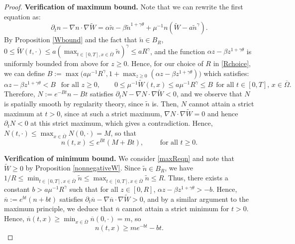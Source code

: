 \documentclass[12pt]{article}
\theoremstyle{plain}
\begin{document}
\begin{proof}
\noindent \textbf{Verification of maximum bound.} Note that we can rewrite the first equation as:
\begin{equation}\label{maxReqn}
\partial_{t}n - \nabla n \cdot \nabla \tilde{W} = \alpha \tilde{n} - \beta \tilde{n}^{1 + \gamma \theta} + \mu^{-1}n(\tilde{W} - a\tilde{n}^{\gamma}).
\end{equation}
By Proposition \ref{Wbound} and the fact that $\tilde{n} \in B_{R}$, $0 \le \tilde{W}(t, \cdot) \le a\left(\max_{t \in [0, T], x \in \overline{\Omega}} \tilde{n}\right)^{\gamma} \le aR^{\gamma}$, and the function $\alpha z - \beta z^{1 + \gamma \theta}$ is uniformly bounded from above for $z \ge 0$. Hence, for our choice of $R$ in \eqref{Rchoice}, we can define $B := \max\Big(a\mu^{-1}R^{\gamma}, 1 + \max_{z \ge 0} (\alpha z - \beta z^{1 + \gamma \theta})\Big)$ which satisfies:
\begin{equation*}
\alpha z - \beta z^{1 + \gamma \theta} < B \ \ \text{ for all } z \ge 0, \qquad 
0 \le \mu^{-1}\tilde{W}(t, x) \le a\mu^{-1}R^{\gamma} \le B \ \ \text{for all $t \in [0, T]$, $x \in \overline{\Omega}$}.
\end{equation*}
Therefore, $N := e^{-Bt}n - Bt$ satisfies $\partial_{t}N - \nabla N \cdot \nabla \tilde{W} < 0$, and we observe that $N$ is spatially smooth by regularity theory, since $\tilde{n}$ is. Then, $N$ cannot attain a strict maximum at $t > 0$, since at such a strict maximum, $\nabla N \cdot \nabla \tilde{W} = 0$ and hence $\partial_{t} N < 0$ at this strict maximum, which gives a contradiction. Hence, $N(t, \cdot) \le \max_{x \in \overline{\Omega}} N(0, \cdot) = M$, so that 
\begin{equation}\label{nBmax}
n(t, x) \le e^{Bt}(M + Bt), \qquad \text{ for all $t \ge 0$.}
\end{equation}

\medskip

\noindent \textbf{Verification of minimum bound.} We consider \eqref{maxReqn} and note that $\tilde{W} \ge 0$ by Proposition \ref{nonnegativeW}. Since $\tilde{n} \in B_{R}$, we have $1/R \le \min_{t \in [0, T], x \in \overline{\Omega}} \tilde{n} \le \max_{t \in [0, T], x \in \overline{\Omega}} \tilde{n} \le R$.
Thus, there exists a constant $b > a\mu^{-1}R^{\gamma}$ such that for all $z \in [0, R]$, $\alpha z - \beta z^{1 + \gamma \theta} > -b$. Hence, $\overline{n} := e^{bt}(n + bt)$ satisfies $\partial_{t}\overline{n} - \nabla \overline{n} \cdot \nabla \tilde{W} > 0$, and by a similar argument to the maximum principle, we deduce that $\overline{n}$ cannot attain a strict minimum for $t > 0$. Hence, $\overline{n}(t, x) \ge \min_{x \in \overline{\Omega}} \overline{n}(0, \cdot) = m$, so
\begin{equation}\label{nbmin}
n(t, x) \ge me^{-bt} - bt.
\end{equation}


\end{proof}
\end{document}
